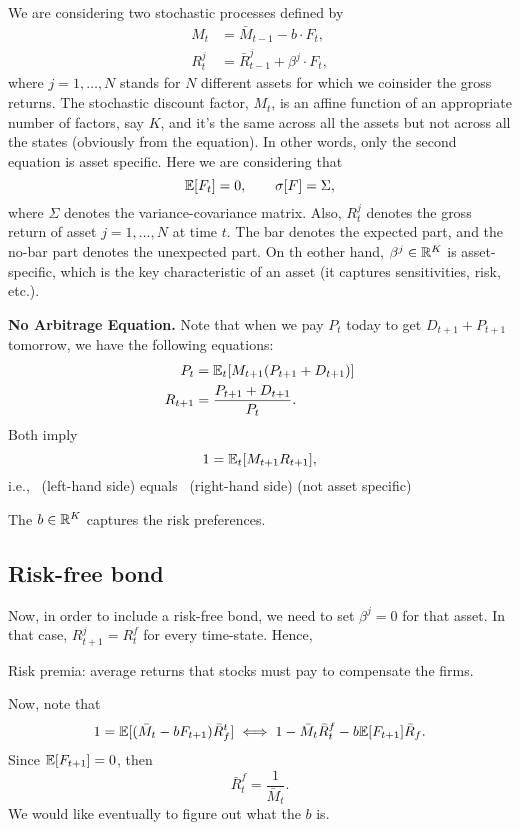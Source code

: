 We are considering two stochastic processes defined by
\begin{equation}
	\begin{aligned}
		M_t &= \bar{M}_{t-1} - b \cdot F_t,\\
		R_t^j &= \bar{R}^j_{t-1} +\beta^j \cdot F_t,
	\end{aligned}
\end{equation}
where $j=1,\ldots, N$ stands for $N$ different assets for which we coinsider the gross returns. The stochastic discount factor, $M_t$, is an affine function of an appropriate number of factors, say $K$, and it's the same across all the assets but not across all the states (obviously from the equation). In other words, only the second equation is asset specific. Here we are considering that 
$$
	\mathbb{E}[F_t] = 0, \quad\quad \sigma[F] = \Sigma,
$$ where $\Sigma$ denotes the variance-covariance matrix. Also, $R_t^j$ denotes the gross return of asset $j=1,\ldots, N$ at time $t$. The bar denotes the expected part, and the no-bar part denotes the unexpected part. On th eother hand, $\beta^j\in\mathbb{R}^K$ is asset-specific, which is the key characteristic of an asset (it captures sensitivities, risk, etc.).

\noindent \textbf{No Arbitrage Equation.} Note that when we pay $P_t$ today to get $D_{t+1} + P_{t+1}$ tomorrow, we have the following equations: 
$$
	\begin{aligned}
		P_t& =\mathbb{E}_t[M_{t+1}(P_{t+1}+D_{t+1})]\\
		R_{t+1}& = \frac{P_{t+1}+D_{t+1}}{P_t}.
	\end{aligned}
$$
Both imply
$$
	1 = \mathbb{E}_t[M_{t+1}R_{t+1}],
$$
i.e., \mc\ (left-hand side) equals \mr\ (right-hand side) (not asset specific)

\note The $b\in\mathbb{R}^K$ captures the risk preferences.

\subsection{Risk-free bond}
Now, in order to include a risk-free bond, we need to set $\beta^j = 0$ for that asset. In that case, $R^j_{t+1} = R^f_{t}$ for every time-state. Hence,

\note Risk premia: average returns that stocks must pay to compensate the firms.

Now, note that
\begin{equation}\label{Rf-Mt}
	1 = \mathbb{E}[(\bar{M}_t - bF_{t+1})\bar{R}_f^t] \iff 1 - \bar{M}_t\bar{R}_t^f - b\mathbb{E}[F_{t+1}]\bar{R}_f.
\end{equation}
Since $\mathbb{E}[F_{t+1}] = 0$, then 
$$
	\bar{R}_t^f = \frac{1}{\bar{M}_t}.
$$
We would like eventually to figure out what the $b$ is. 

